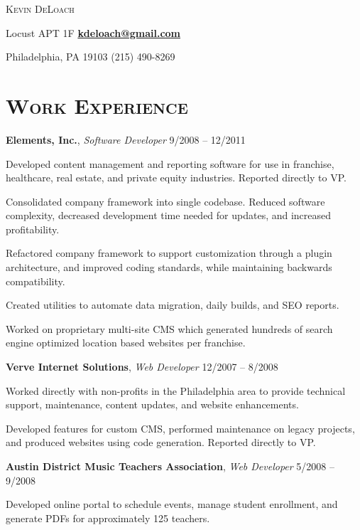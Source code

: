 \documentclass[12pt,a4paper,draft]{article}
\newcommand{\sectionhead}{\normalfont\normalsize\scshape}
\newcommand{\li}{\item[--]}
\newcommand{\workhead}[3]{\textbf{#1}, \emph{#2} \hfill #3}
\begin{document}

\begin{center}
\textsc{\huge{Kevin DeLoach}}
\end{center}

 Locust APT 1F
\hfill
\href{mailto:kdeloach@gmail.com}{\bfseries kdeloach@gmail.com}

\noindent
Philadelphia, PA 19103
\hfill
(215) 490-8269

\section*{\sectionhead Work Experience}
\begin{description}[leftmargin=1em] \itemsep10pt \parskip0pt

    \item 
        \workhead{Elements, Inc.}{Software Developer}{9/2008 -- 12/2011}
        \begin{itemize*}
            \li Developed content management and reporting software for use in franchise, healthcare, real estate, and private equity industries. Reported directly to VP.
            \li Consolidated company framework into single codebase. 
                Reduced software complexity, decreased development time needed for updates, and increased profitability.
            \li Refactored company framework to support customization through a plugin architecture, and improved coding standards, while maintaining backwards compatibility.
            \li Created utilities to automate data migration, daily builds, and SEO reports. 
            \li Worked on proprietary multi-site CMS which generated hundreds of search engine optimized location based websites per franchise.
        \end{itemize*}

    \item 
        \workhead{Verve Internet Solutions}{Web Developer}{12/2007 -- 8/2008}
        \begin{itemize*}
            \li Worked directly with non-profits in the Philadelphia area to provide technical support, maintenance, content updates, and website enhancements.
            \li Developed features for custom CMS, performed maintenance on legacy projects, and produced websites using code generation. Reported directly to VP.
        \end{itemize*}

    \item
        \workhead{Austin District Music Teachers Association}{Web Developer}{5/2008 -- 9/2008}
        \begin{itemize*}
            \li Developed online portal to schedule events, manage student enrollment, and generate PDFs for approximately 125 teachers.
        \end{itemize*}


\end{description}
\end{document}
